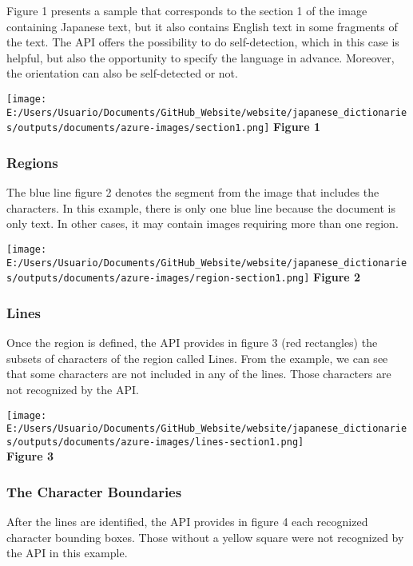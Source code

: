 \documentclass[
]{article}
\begin{document}
Figure 1 presents a sample that corresponds to the section 1 of the
image containing Japanese text, but it also contains English text in
some fragments of the text. The API offers the possibility to do
self-detection, which in this case is helpful, but also the opportunity
to specify the language in advance. Moreover, the orientation can also
be self-detected or not.

\texttt{[image: E:/Users/Usuario/Documents/GitHub\_Website/website/japanese\_dictionaries/outputs/documents/azure-images/section1.png]}
\textbf{Figure 1}

\hypertarget{regions}{%
\subsubsection{Regions}\label{regions}}

The blue line figure 2 denotes the segment from the image that includes
the characters. In this example, there is only one blue line because the
document is only text. In other cases, it may contain images requiring
more than one region.

\texttt{[image: E:/Users/Usuario/Documents/GitHub\_Website/website/japanese\_dictionaries/outputs/documents/azure-images/region-section1.png]}
\textbf{Figure 2}

\hypertarget{lines}{%
\subsubsection{Lines}\label{lines}}

Once the region is defined, the API provides in figure 3 (red
rectangles) the subsets of characters of the region called Lines. From
the example, we can see that some characters are not included in any of
the lines. Those characters are not recognized by the API.

\texttt{[image: E:/Users/Usuario/Documents/GitHub\_Website/website/japanese\_dictionaries/outputs/documents/azure-images/lines-section1.png]}\\
\textbf{Figure 3}

\hypertarget{the-character-boundaries}{%
\subsubsection{The Character
Boundaries}\label{the-character-boundaries}}

After the lines are identified, the API provides in figure 4 each
recognized character bounding boxes. Those without a yellow square were
not recognized by the API in this example.
\end{document}
